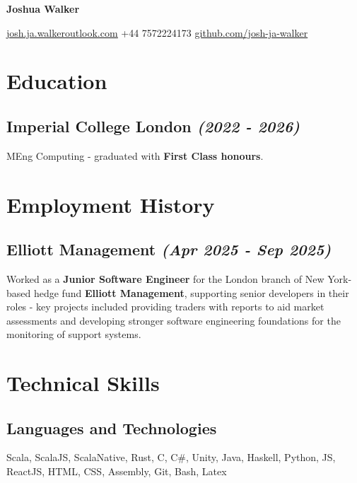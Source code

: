 \documentclass{article}
\makeatletter
\newcommand{\contact}[1]{\normalsize{#1}}
\newcommand{\contactdiv}{\hspace*{0.8em}}
\newcommand{\email}[2]{\href{mailto:#1@#2}{\underline{#1{\small\fontfamily{phv}\selectfont@}#2}}}
\newcommand{\github}{\href{https://github.com/josh-ja-walker}{\underline{github.com/josh-ja-walker}}}
\newcommand{\dates}[1]{\hfill\textit{(#1)}}
\newcommand{\indentsubsection}[2]{
    \subsection*{#1}
    #2
}
\makeatother
\begin{document}

\begin{center}
    {\LARGE\textbf{Joshua Walker}}
    
    \vspace{0.5em}
    
    \contact{\email{josh.ja.walker}{outlook.com}}
    \contactdiv
    \contact{+44 7572224173}
    \contactdiv
    \github
\end{center}



\section*{Education}

\indentsubsection{\textbf{Imperial College London} \dates{2022 - 2026}}{
    MEng Computing - graduated with \textbf{First Class honours}.
}


\section*{Employment History}

\indentsubsection{\textbf{Elliott Management} \dates{Apr 2025 - Sep 2025}}{
    Worked as a \textbf{Junior Software Engineer} for the London branch of New York-based hedge fund \textbf{Elliott Management}, supporting senior developers in their roles - key projects included providing traders with reports to aid market assessments and developing stronger software engineering foundations for the monitoring of support systems.
}



\section*{Technical Skills}

\subsection*{\textbf{Languages and Technologies}}
Scala, ScalaJS, ScalaNative, Rust, C, C\#, Unity, Java, Haskell, Python, JS, ReactJS, HTML, CSS, Assembly, Git, Bash, Latex
\end{document}
